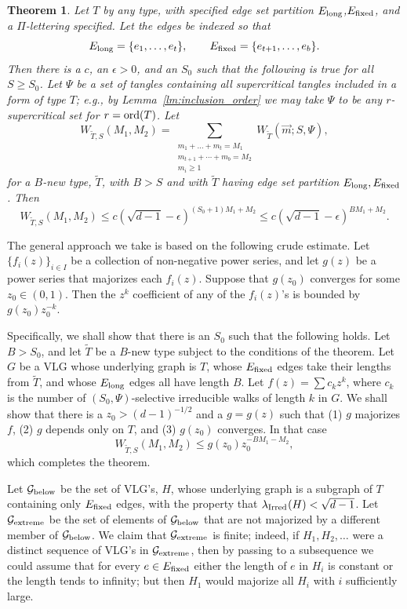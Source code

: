 \documentclass[12pt]{article}
\newtheorem{theorem}{Theorem}[section]
\newcommand{\ord}{{\rm ord}}
\newcommand{\El}{{E_{\rm long}}}
\newcommand{\Ef}{{E_{\rm fixed}}}
\newcommand{\tset}{{\Psi}}
\newcommand{\proof}{{\par\noindent {\bf Proof}\space\space}}
\newcommand{\ird}[1]{{\rm Irred}_{#1}}
\begin{document}
\begin{theorem}\label{th:crucial_cycle_count}
Let $T$ by any type, with specified edge set partition
$\El$,$\Ef$, and a $\Pi$-lettering specified.  
Let the edges be indexed so that
$$
\El=\{e_1,\ldots,e_t\}, \qquad \Ef=\{e_{t+1},\ldots,e_b\}.
$$
Then there is a $c$, an
$\epsilon>0$, and
an $S_0$ such
that the following is true for all $S\ge S_0$.  Let
$\tset$ be a set of tangles containing all supercritical tangles included
in a form of type $T$; e.g., by Lemma~\ref{lm:inclusion_order} we may
take $\tset$ to be any $r$-supercritical set for $r=\ord(T)$.
Let
$$
W_{\widetilde T,S}(M_1,M_2) = 
\sum_{\substack{ m_1+\ldots+m_t=M_1\\
m_{t+1}+\cdots+m_b=M_2\\ m_i\ge 1}}
W_{\widetilde T}(\vec m;S,\tset),
$$
for a $B$-new type, $\widetilde T$, with $B>S$ and with $\widetilde T$
having edge set partition $\El,\Ef$.  Then
$$
W_{\widetilde T,S}(M_1,M_2) \le c (\sqrt{d-1}-\epsilon)^{(S_0+1)M_1+M_2}
\le c (\sqrt{d-1}-\epsilon)^{BM_1+M_2}.
$$
\end{theorem}
\proof 
The general approach we take is based on the following crude estimate.
Let $\{f_i(z)\}_{i\in I}$ be a collection of non-negative power series,
and let $g(z)$ be a power series that majorizes each $f_i(z)$.
Suppose that
$g(z_0)$ converges for some $z_0\in(0,1)$.  Then the $z^k$ coefficient
of any of the $f_i(z)$'s is bounded by $g(z_0)z_0^{-k}$.

Specifically, we shall show that there is an $S_0$ such that the
following holds.
Let $B>S_0$, and let $\widetilde T$ be a $B$-new type subject to the
conditions of the theorem.  
Let $G$ be a VLG whose underlying graph is $T$, whose $\Ef$ edges take
their lengths from $\widetilde T$, and whose $\El$ edges all have length
$B$.  Let $f(z)=\sum c_k z^k$, where $c_k$ is the number of
$(S_0,\tset)$-selective irreducible walks of length $k$ in $G$.
We shall show that
there is a $z_0> (d-1)^{-1/2}$ and a $g=g(z)$ such that
(1) $g$ majorizes $f$, (2) $g$ depends only on $T$, and (3) $g(z_0)$
converges.  In that case
$$
W_{\widetilde T,S}(M_1,M_2) \le g(z_0) z_0^{-BM_1-M_2},
$$
which completes the theorem.

Let ${\cal G}_{\rm below}$ be the set of VLG's, $H$, whose underlying graph
is a subgraph of $T$ containing only $\Ef$ edges, with the property that
$\lambda_{\ird{}}(H)<\sqrt{d-1}$.  Let ${\cal G}_{\rm extreme}$ be the set
of elements
of ${\cal G}_{\rm below}$ that are not majorized by a different member
of ${\cal G}_{\rm below}$.  We claim that ${\cal G}_{\rm extreme}$ is
finite; indeed, if $H_1,H_2,\ldots$ were a distinct sequence of VLG's
in ${\cal G}_{\rm extreme}$, then by passing to a subsequence we could
assume that for every $e\in \Ef$ either the length of $e$ in $H_i$ is
constant or the length tends to infinity; but then $H_1$ would majorize
all $H_i$ with $i$ sufficiently large.
\end{document}
